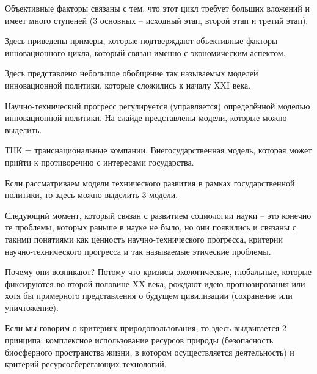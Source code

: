 \documentclass[main.tex]{subfiles}
\begin{document}
Объективные факторы связаны с тем, что этот цикл требует больших вложений и имеет много ступеней (3 основных -- исходный этап, второй этап и третий этап).


Здесь приведены примеры, которые подтверждают объективные факторы инновационного цикла, который связан именно с экономическим аспектом.



Здесь представлено небольшое обобщение так называемых моделей инновационной политики, которые сложились к началу XXI века.

Научно-технический прогресс регулируется (управляется) определённой моделью инновационной политики.
На слайде представлены модели, которые можно выделить.

ТНК = транснациональные компании.
Внегосударственная модель, которая может прийти к противоречию с интересами государства.



Если рассматриваем модели технического развития в рамках государственной политики, то здесь можно выделить 3 модели.



Следующий момент, который связан с развитием социологии науки -- это конечно те проблемы, которых раньше в науке не было, но они появились и связаны с такими понятиями как ценность научно-технического прогресса, критерии научно-технического прогресса и так называемые этические проблемы.

Почему они возникают?
Потому что кризисы экологические, глобальные, которые фиксируются во второй половине XX века, рождают идею прогнозирования или хотя бы примерного представления о будущем цивилизации (сохранение или уничтожение).

Если мы говорим о критериях природопользования, то здесь выдвигается 2 принципа: комплексное использование ресурсов природы (безопасность биосферного пространства жизни, в котором осуществляется деятельность) и критерий ресурсосберегающих технологий.

\end{document}
